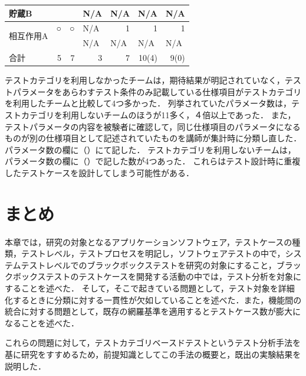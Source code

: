 \begin{table}[htbp]
\begin{tabular}{|l|r|r|r|r|r|r|}
    \hline
    貯蔵B   &       &       & \multicolumn{1}{l|}{N/A} & \multicolumn{1}{l|}{N/A} & \multicolumn{1}{l|}{N/A} & \multicolumn{1}{l|}{N/A} \bigstrut\\
    \hline
    \multirow{2}[4]{*}{相互作用A} & \multicolumn{1}{c|}{○} & \multicolumn{1}{c|}{○} & \multicolumn{1}{l|}{N/A} & 1     & 1     & 1 \bigstrut\\
\cline{2-7}          &       &       & \multicolumn{1}{l|}{N/A} & \multicolumn{1}{l|}{N/A} & \multicolumn{1}{l|}{N/A} & \multicolumn{1}{l|}{N/A} \bigstrut\\
    \hline
    合計    & 5     & 7     & 3     & 7     & 10(4) & 9(0) \bigstrut\\
    \hline
    \end{tabular}%
  \label{tab:D-2-resilt2}%
\end{table}%


テストカテゴリを利用しなかったチームは，期待結果が明記されていなく，テストパラメータをあらわすテスト条件のみ記載している仕様項目がテストカテゴリを利用したチームと比較して4つ多かった．
列挙されていたパラメータ数は，テストカテゴリを利用しないチームのほうが11多く，４倍以上であった．
また，テストパラメータの内容を被験者に確認して，同じ仕様項目のパラメータになるものが別の仕様項目として記述されていたものを講師が集計時に分類し直した．パラメータ数の欄に（）にて記した．
テストカテゴリを利用しないチームは，パラメータ数の欄に（）で記した数が4つあった．
これらはテスト設計時に重複したテストケースを設計してしまう可能性がある．

\section{まとめ}
本章では，研究の対象となるアプリケーションソフトウェア，テストケースの種類，テストレベル，テストプロセスを明記し，ソフトウェアテストの中で，システムテストレベルでのブラックボックステストを研究の対象にすること，ブラックボックステストのテストケースを開発する活動の中では，テスト分析を対象にすることを述べた．
そして，そこで起きている問題として，テスト対象を詳細化するときに分類に対する一貫性が欠如していることを述べた．また，機能間の統合に対する問題として，既存の網羅基準を適用するとテストケース数が膨大になることを述べた．

これらの問題に対して，テストカテゴリベースドテストというテスト分析手法を基に研究をすすめるため，前提知識としてこの手法の概要と，既出の実験結果を説明した．
